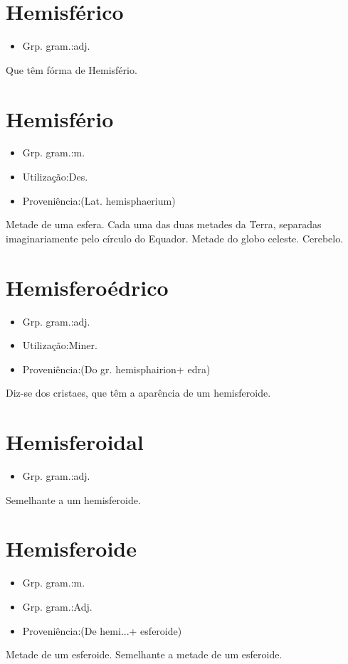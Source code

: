 \documentclass{article}
\begin{document}
\section{Hemisférico}
\begin{itemize}
\item {Grp. gram.:adj.}
\end{itemize}
Que têm fórma de Hemisfério.
\section{Hemisfério}
\begin{itemize}
\item {Grp. gram.:m.}
\end{itemize}
\begin{itemize}
\item {Utilização:Des.}
\end{itemize}
\begin{itemize}
\item {Proveniência:(Lat. \textunderscore hemisphaerium\textunderscore )}
\end{itemize}
Metade de uma esfera.
Cada uma das duas metades da Terra, separadas imaginariamente pelo círculo do Equador.
Metade do globo celeste.
Cerebelo.
\section{Hemisferoédrico}
\begin{itemize}
\item {Grp. gram.:adj.}
\end{itemize}
\begin{itemize}
\item {Utilização:Miner.}
\end{itemize}
\begin{itemize}
\item {Proveniência:(Do gr. \textunderscore hemisphairion\textunderscore  + \textunderscore edra\textunderscore )}
\end{itemize}
Diz-se dos cristaes, que têm a aparência de um hemisferoide.
\section{Hemisferoidal}
\begin{itemize}
\item {Grp. gram.:adj.}
\end{itemize}
Semelhante a um hemisferoide.
\section{Hemisferoide}
\begin{itemize}
\item {Grp. gram.:m.}
\end{itemize}
\begin{itemize}
\item {Grp. gram.:Adj.}
\end{itemize}
\begin{itemize}
\item {Proveniência:(De \textunderscore hemi...\textunderscore  + \textunderscore esferoide\textunderscore )}
\end{itemize}
Metade de um esferoide.
Semelhante a metade de um esferoide.
\end{document}
